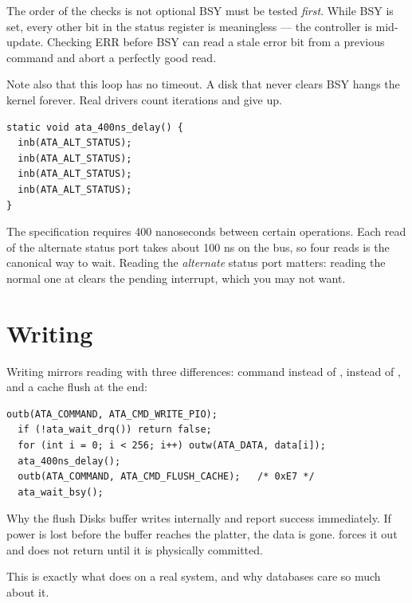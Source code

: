 \begin{warn}{The order of the checks is not optional}
BSY must be tested \emph{first}. While BSY is set, every other bit in the status register is
meaningless --- the controller is mid-update. Checking ERR before BSY can read a stale error bit
from a previous command and abort a perfectly good read.

Note also that this loop has no timeout. A disk that never clears BSY hangs the kernel forever.
Real drivers count iterations and give up.
\end{warn}

\begin{lstlisting}[style=c]
static void ata_400ns_delay() {
  inb(ATA_ALT_STATUS);
  inb(ATA_ALT_STATUS);
  inb(ATA_ALT_STATUS);
  inb(ATA_ALT_STATUS);
}
\end{lstlisting}

The specification requires 400 nanoseconds between certain operations. Each read of the alternate
status port takes about 100 ns on the bus, so four reads is the canonical way to wait. Reading the
\emph{alternate} status port matters: reading the normal one at  clears the pending
interrupt, which you may not want.

\section{Writing}

Writing mirrors reading with three differences: command  instead of ,
 instead of , and a cache flush at the end:

\begin{lstlisting}[style=c]
  outb(ATA_COMMAND, ATA_CMD_WRITE_PIO);
  if (!ata_wait_drq()) return false;
  for (int i = 0; i < 256; i++) outw(ATA_DATA, data[i]);
  ata_400ns_delay();
  outb(ATA_COMMAND, ATA_CMD_FLUSH_CACHE);   /* 0xE7 */
  ata_wait_bsy();
\end{lstlisting}

\begin{concept}{Why the flush}
Disks buffer writes internally and report success immediately. If power is lost before the buffer
reaches the platter, the data is gone.  forces it out and does not return until it
is physically committed.

This is exactly what  does on a real system, and why databases care so much about it.
\end{concept}

